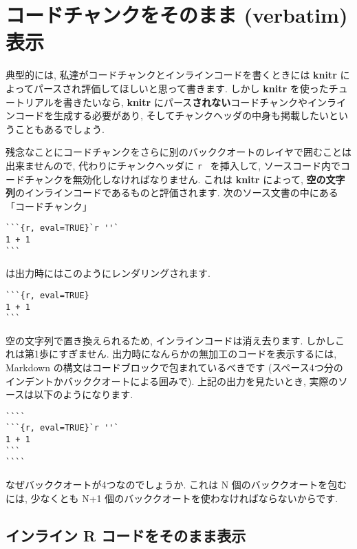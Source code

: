 \documentclass[
  11pt,
  lualatex,ja=standard,jafont=noto]{bxjsreport}
\begin{document}
\hypertarget{verbatim-code-chunks}{%
\section{コードチャンクをそのまま (verbatim) 表示}\label{verbatim-code-chunks}}

典型的には, 私達がコードチャンクとインラインコードを書くときには \textbf{knitr} によってパースされ評価してほしいと思って書きます. しかし \textbf{knitr} を使ったチュートリアルを書きたいなら, \textbf{knitr} にパース\textbf{されない}コードチャンクやインラインコードを生成する必要があり, そしてチャンクヘッダの中身も掲載したいということもあるでしょう.

残念なことにコードチャンクをさらに別のバッククオートのレイヤで囲むことは出来ませんので, 代わりにチャンクヘッダに \texttt{\textasciigrave{}r\ \textquotesingle{}\textquotesingle{}\textasciigrave{}} を挿入して, ソースコード内でコードチャンクを無効化しなければなりません. これは \textbf{knitr} によって, \textbf{空の文字列}のインラインコードであるものと評価されます. 次のソース文書の中にある「コードチャンク」

\begin{verbatim}
```{r, eval=TRUE}`r ''`
1 + 1
```
\end{verbatim}

は出力時にはこのようにレンダリングされます.

\begin{verbatim}
```{r, eval=TRUE}
1 + 1
```
\end{verbatim}

空の文字列で置き換えられるため, インラインコードは消え去ります. しかしこれは第1歩にすぎません. 出力時になんらかの無加工のコードを表示するには, Markdown の構文はコードブロックで包まれているべきです (スペース4つ分のインデントかバッククオートによる囲みで). 上記の出力を見たいとき, 実際のソースは以下のようになります.

\begin{verbatim}
````
```{r, eval=TRUE}`r ''`
1 + 1
```
````
\end{verbatim}

なぜバッククオートが4つなのでしょうか. これは N 個のバッククオートを包むには, 少なくとも N+1 個のバッククオートを使わなければならないからです.

\hypertarget{show-a-verbatim-inline-expression}{%
\subsection{インライン R コードをそのまま表示}\label{show-a-verbatim-inline-expression}}
\end{document}
